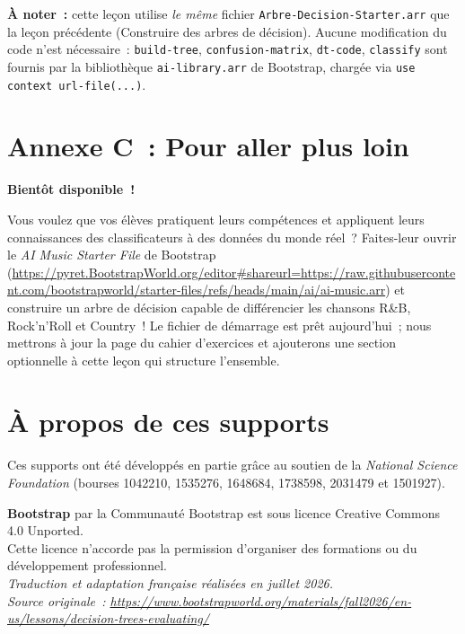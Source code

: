 \documentclass[12pt,a4paper]{article}
\begin{document}
\vspace{1em}
\textbf{À noter~:} cette leçon utilise \emph{le même} fichier \texttt{Arbre-Decision-Starter.arr} que la leçon précédente (Construire des arbres de décision). Aucune modification du code n'est nécessaire~: \texttt{build-tree}, \texttt{confusion-matrix}, \texttt{dt-code}, \texttt{classify} sont fournis par la bibliothèque \texttt{ai-library.arr} de Bootstrap, chargée via \texttt{use context url-file(...)}.

\section*{Annexe C~: Pour aller plus loin}

\begin{instructornotes}
  \textbf{Bientôt disponible~!}

  Vous voulez que vos élèves pratiquent leurs compétences et appliquent leurs connaissances des classificateurs à des données du monde réel~? Faites-leur ouvrir le \emph{AI Music Starter File} de Bootstrap (\url{https://pyret.BootstrapWorld.org/editor\#shareurl=https://raw.githubusercontent.com/bootstrapworld/starter-files/refs/heads/main/ai/ai-music.arr}) et construire un arbre de décision capable de différencier les chansons R\&B, Rock'n'Roll et Country~! Le fichier de démarrage est prêt aujourd'hui~; nous mettrons à jour la page du cahier d'exercices et ajouterons une section optionnelle à cette leçon qui structure l'ensemble.
\end{instructornotes}

\section*{À propos de ces supports}

Ces supports ont été développés en partie grâce au soutien de la \emph{National Science Foundation} (bourses 1042210, 1535276, 1648684, 1738598, 2031479 et 1501927).

\begin{center}
  \textbf{Bootstrap} par la Communauté Bootstrap est sous licence Creative Commons 4.0 Unported.\\
  Cette licence n'accorde pas la permission d'organiser des formations ou du développement professionnel.\\[1em]
  \textit{Traduction et adaptation française réalisées en juillet 2026.}\\
  \textit{Source originale~: \url{https://www.bootstrapworld.org/materials/fall2026/en-us/lessons/decision-trees-evaluating/}}
\end{center}
\end{document}
